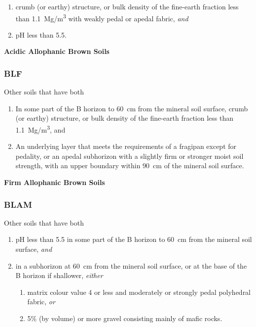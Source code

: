 \documentclass[
  letterpaper,
  DIV=11,
  numbers=noendperiod]{scrreprt}
\providecommand{\tightlist}{%
  \setlength{\itemsep}{0pt}\setlength{\parskip}{0pt}}\usepackage{longtable,booktabs,array}
\begin{document}
\begin{enumerate}
\def\labelenumi{\arabic{enumi}.}
\tightlist
\item
  crumb (or earthy) structure, or bulk density of the fine-earth
  fraction less than 1.1~Mg/m\textsuperscript{3} with weakly pedal or
  apedal fabric, \emph{and}
\item
  pH less than 5.5.
\end{enumerate}

\textbf{Acidic Allophanic Brown Soils}

\hypertarget{sec-key-BLF}{%
\subsubsection{\texorpdfstring{\textbf{BLF}}{BLF}}\label{sec-key-BLF}}

Other soils that have both

\begin{enumerate}
\def\labelenumi{\arabic{enumi}.}
\tightlist
\item
  In some part of the B horizon to 60~cm from the mineral soil surface,
  crumb (or earthy) structure, or bulk density of the fine-earth
  fraction less than 1.1~Mg/m\textsuperscript{3}, and
\item
  An underlying layer that meets the requirements of a fragipan except
  for pedality, or an apedal subhorizon with a slightly firm or stronger
  moist soil strength, with an upper boundary within 90~cm of the
  mineral soil surface.
\end{enumerate}

\textbf{Firm Allophanic Brown Soils}

\hypertarget{sec-key-BLAM}{%
\subsubsection{\texorpdfstring{\textbf{BLAM}}{BLAM}}\label{sec-key-BLAM}}

Other soils that have both

\begin{enumerate}
\def\labelenumi{\arabic{enumi}.}
\tightlist
\item
  pH less than 5.5 in some part of the B horizon to 60~cm from the
  mineral soil surface, \emph{and}
\item
  in a subhorizon at 60~cm from the mineral soil surface, or at the base
  of the B horizon if shallower, \emph{either}

  \begin{enumerate}
  \def\labelenumii{(\alph{enumii})}
  \tightlist
  \item
    matrix colour value 4 or less and moderately or strongly pedal
    polyhedral fabric, \emph{or}
  \item
    5\% (by volume) or more gravel consisting mainly of mafic rocks.
  \end{enumerate}
\end{enumerate}
\end{document}
